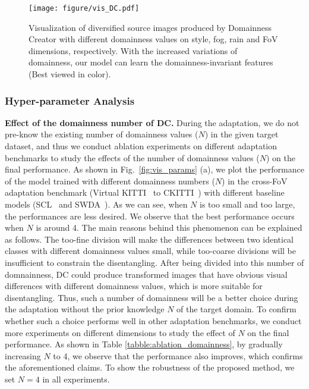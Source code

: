 \documentclass[10pt,journal,compsoc]{IEEEtran}
\begin{document}
\begin{figure*}[t]
\centering
\texttt{[image: figure/vis\_DC.pdf]}
\caption{
Visualization of diversified source images produced by Domainness Creator with different domainness values on style, fog, rain and FoV dimensions, respectively. 
With the increased variations of domainness, our model can learn the domainness-invariant features (Best viewed in color).
}
\label{fig:dc_results}
\end{figure*}
\subsubsection{Hyper-parameter Analysis}

\noindent \textbf{Effect of the domainness number of DC.}  
During the adaptation, we do not pre-know the existing number of domainness values ($N$) in the given target dataset, and thus we conduct ablation experiments on different adaptation benchmarks to study the effects of the number of domainness values ($N$) on the final performance. 
As shown in Fig.~\ref{fig:vis_params} (a), we plot the performance of the model trained with different domainness numbers ($N$) in the cross-FoV adaptation benchmark (Virtual KITTI~\cite{VKITTI} to CKITTI~\cite{cordts2016cityscapes,kITTI})  with different baseline models (SCL~\cite{SCL} and SWDA~\cite{SWDA}). As we can see, when $N$ is too small and too large, the performances are less desired. We observe that the best performance occurs when $N$ is around 4. The main reasons behind this phenomenon can be explained as follows. The too-fine division will make the differences between two identical classes with different domainness values small, while too-coarse divisions will be insufficient to constrain the disentangling. After being divided into this number of domnainness, DC could produce transformed images that have obvious visual differences with different domainness values, which is more suitable for disentangling. Thus, such a number of domainness will be a better choice during the adaptation without the prior knowledge $N$ of the target domain. 
To confirm whether such a choice performs well in other adaptation benchmarks, we conduct more experiments on different dimensions to study the effect of $N$ on the final performance. As shown in Table \ref{tabble:ablation_domainness}, by gradually increasing $N$ to 4, we observe that the performance also improves, which confirms the aforementioned claims. To show the robustness of the proposed method, we set $N=4$ in all experiments. 
\end{document}

